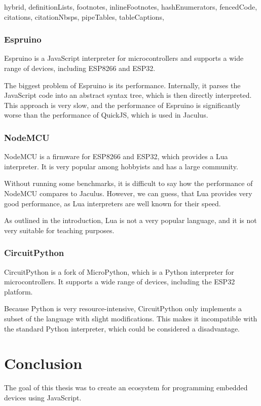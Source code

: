 \begin{markdown*}{%
  hybrid,
  definitionLists,
  footnotes,
  inlineFootnotes,
  hashEnumerators,
  fencedCode,
  citations,
  citationNbsps,
  pipeTables,
  tableCaptions,
}
\subsection{Espruino}

Espruino is a JavaScript interpreter for microcontrollers and supports a wide range of devices, including ESP8266 and ESP32.

The biggest problem of Espruino is its performance. Internally, it parses the JavaScript code into an abstract syntax tree, which is then directly interpreted. This approach is very slow, and the performance of Espruino is significantly worse than the performance of QuickJS, which is used in Jaculus.

\subsection{NodeMCU}

NodeMCU is a firmware for ESP8266 and ESP32, which provides a Lua interpreter. It is very popular among hobbyists and has a large community.

Without running some benchmarks, it is difficult to say how the performance of NodeMCU compares to Jaculus. However, we can guess, that Lua provides very good performance, as Lua interpreters are well known for their speed.

As outlined in the introduction, Lua is not a very popular language, and it is not very suitable for teaching purposes.

\subsection{CircuitPython}

CircuitPython is a fork of MicroPython, which is a Python interpreter for microcontrollers. It supports a wide range of devices, including the ESP32 platform.

Because Python is very resource-intensive, CircuitPython only implements a subset of the language with slight modifications. This makes it incompatible with the standard Python interpreter, which could be considered a disadvantage.


\chapter{Conclusion}

The goal of this thesis was to create an ecosystem for programming embedded devices using JavaScript.


\end{markdown*}
